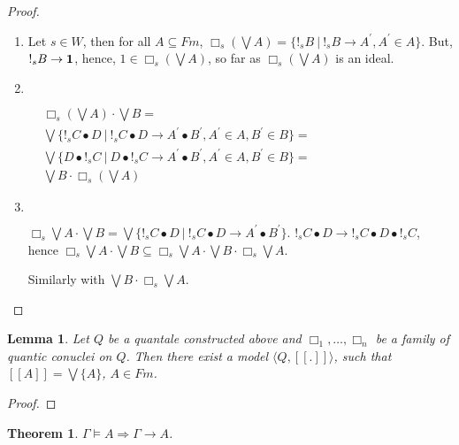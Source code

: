 \documentclass[a4paper]{article}
\newtheorem{theorem}{Theorem}
\newtheorem{lemma}{Lemma}
\begin{document}
\begin{proof}
  \begin{enumerate}
    \item Let $s \in W$, then for all $A \subseteq Fm$, $\Box_s (\bigvee A) = \{ !_s B \: | \: !_s B \rightarrow A^{'}, A^{'} \in A \}$.
    But, $!_s B \rightarrow {\bf 1}$, hence, $1 \in \Box_s (\bigvee A)$, so far as $\Box_s (\bigvee A)$ is an ideal.
    \item  $ $

    $\begin{array}{lll}
    &\Box_s (\bigvee A) \cdot \bigvee B = & \\
    &\bigvee \{ !_s C \bullet D \: | \: !_s C \bullet D \rightarrow A^{'} \bullet B^{'}, A^{'} \in A, B^{'} \in B \} = & \\
    &\bigvee \{ D \bullet !_s C \: | \: D \bullet !_s C \rightarrow A^{'} \bullet B^{'}, A^{'} \in A, B^{'} \in B \} = & \\
    &\bigvee B \cdot \Box_s (\bigvee A)&
    \end{array}$

    \item $ $

    $\Box_s \bigvee A \cdot \bigvee B = \bigvee \{ !_s C \bullet D \: | \: !_s C \bullet D \rightarrow A^{'} \bullet B^{'}\}$.
    $!_s C \bullet D \rightarrow !_s C \bullet D \bullet !_s C$, hence $\Box_s \bigvee A \cdot \bigvee B \subseteq \Box_s \bigvee A \cdot \bigvee B \cdot \Box_s \bigvee A$.

    Similarly with $\bigvee B \cdot \Box_s \bigvee A$.
  \end{enumerate}
\end{proof}

\begin{lemma}
  Let $Q$ be a quantale constructed above and $\Box_1, \dots, \Box_n$ be a family of quantic conuclei on $Q$.
  Then there exist a model $\langle Q, [\![.]\!]\rangle$, such that $[\![A]\!] = \bigvee \{ A \}$, $A \in Fm$.
\end{lemma}

\begin{proof}
\end{proof}

\begin{theorem}
  $\Gamma \models A \Rightarrow \Gamma \rightarrow A$.
\end{theorem}
\end{document}
